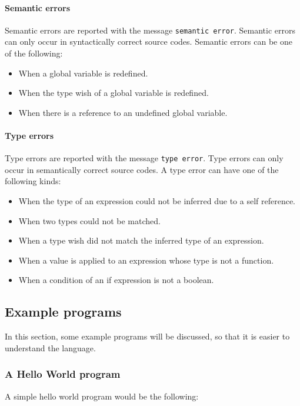 \documentclass[12pt]{article}
\begin{document}
\paragraph{Semantic errors} Semantic errors are reported with the message
\verb$semantic error$. Semantic errors can only occur in syntactically correct
source codes. Semantic errors can be one of the following:
\begin{itemize}
    \item When a global variable is redefined.
    \item When the type wish of a global variable is redefined.
    \item When there is a reference to an undefined global variable. 
\end{itemize}

\paragraph{Type errors} Type errors are reported with the message
\verb$type error$. Type errors can only occur in semantically correct source
codes. A type error can have one of the following kinds:
\begin{itemize}
    \item When the type of an expression could not be inferred due to a self
        reference.
    \item When two types could not be matched.
    \item When a type wish did not match the inferred type of an expression.
    \item When a value is applied to an expression whose type is not a function.
    \item When a condition of an if expression is not a boolean.
\end{itemize}

\subsection{Example programs}
\lstset{numbers=left}

In this section, some example programs will be discussed, so that it is easier
to understand the language.

\subsubsection{A Hello World program}

A simple hello world program would be the following:

\end{document}

